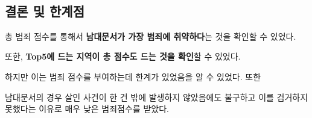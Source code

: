 \documentclass[11pt]{article}
\begin{document}
    \begin{center}
    \end{center}
    { \hspace*{\fill} \\}
    
    \subsection{결론 및
한계점}\label{uxacb0uxb860-uxbc0f-uxd55cuxacc4uxc810}

총 범죄 점수를 통해서 \textbf{남대문서가 가장 범죄에 취약하다}는 것을
확인할 수 있었다.

또한, \textbf{Top5에 드는 지역이 총 점수도 드는 것을 확인}할 수 있었다.

하지만 이는 범죄 점수를 부여하는데 한계가 있었음을 알 수 있었다. 또한

남대문서의 경우 살인 사건이 한 건 밖에 발생하지 않았음에도 불구하고 이를
검거하지 못했다는 이유로 매우 낮은 범죄점수를 받았다.


    
    
    
    
\end{document}
